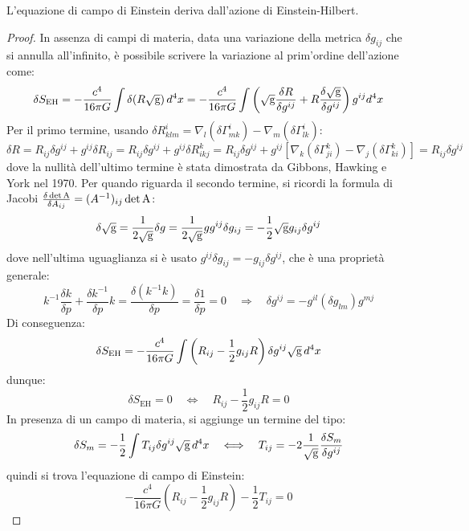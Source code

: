 \begin{proposition}
	L'equazione di campo di Einstein deriva dall'azione di Einstein-Hilbert.
\end{proposition}
\begin{proof}
	In assenza di campi di materia, data una variazione della metrica $ \delta g_{ij} $ che si annulla all'infinito, è possibile scrivere la variazione al prim'ordine dell'azione come:
	\begin{equation*}
		\delta S_{\text{EH}} = - \frac{c^4}{16\pi G} \int \delta (R\sqrt{\mathbf{\text{g}}}) \,d^4x = - \frac{c^4}{16\pi G} \int \left( \sqrt{\mathbf{\text{g}}} \frac{\delta R}{\delta g^{ij}} + R \frac{\delta \sqrt{\mathbf{\text{g}}}}{\delta g^{ij}} \right) g^{ij} d^4x
	\end{equation*}
	Per il primo termine, usando $ \delta R^i_{klm} = \nabla_l (\delta \Gamma^i_{mk}) - \nabla_m (\delta \Gamma^i_{lk}) $:
	\begin{equation*}
		\delta R = R_{ij} \delta g^{ij} + g^{ij} \delta R_{ij} = R_{ij} \delta g^{ij} + g^{ij} \delta R^k_{ikj} = R_{ij} \delta g^{ij} + g^{ij} \left[ \nabla_k (\delta \Gamma^k_{ji}) - \nabla_j (\delta \Gamma^k_{ki}) \right] = R_{ij} \delta g^{ij}
	\end{equation*}
	dove la nullità dell'ultimo termine è stata dimostrata da Gibbons, Hawking e York nel 1970. Per quando riguarda il secondo termine, si ricordi la formula di Jacobi $ \frac{\delta \det \mathbf{\text{A}}}{\delta A_{ij}} = (A^{-1})_{ij} \det \mathbf{\text{A}} $:
	\begin{equation*}
		\delta \sqrt{\mathbf{\text{g}}} = \frac{1}{2\sqrt{\mathbf{\text{g}}}} \delta g = \frac{1}{2\sqrt{\mathbf{\text{g}}}} g g^{ij} \delta g_{ij} = - \frac{1}{2} \sqrt{\mathbf{\text{g}}} g_{ij} \delta g^{ij}
	\end{equation*}
	dove nell'ultima uguaglianza si è usato $ g^{ij} \delta g_{ij} = - g_{ij} \delta g^{ij} $, che è una proprietà generale:
	\begin{equation*}
		k^{-1} \frac{\delta k}{\delta p} + \frac{\delta k^{-1}}{\delta p} k = \frac{\delta (k^{-1} k)}{\delta p} = \frac{\delta 1}{\delta p} = 0 \quad\Longrightarrow\quad \delta g^{ij} = - g^{il} (\delta g_{lm}) g^{mj}
	\end{equation*}
	Di conseguenza:
	\begin{equation*}
		\delta S_{\text{EH}} = - \frac{c^4}{16\pi G} \int \left( R_{ij} - \frac{1}{2} g_{ij} R \right) \delta g^{ij} \sqrt{\mathbf{\text{g}}} \,d^4x
	\end{equation*}
	dunque:
	\begin{equation*}
		\delta S_{\text{EH}} = 0 \quad\Longleftrightarrow\quad R_{ij} - \frac{1}{2} g_{ij} R = 0
	\end{equation*}
	In presenza di un campo di materia, si aggiunge un termine del tipo:
	\begin{equation*}
		\delta S_m = - \frac{1}{2} \int T_{ij} \delta g^{ij} \sqrt{\mathbf{\text{g}}} \,d^4x \quad\Longleftrightarrow\quad T_{ij} = - 2 \frac{1}{\sqrt{\mathbf{\text{g}}}} \frac{\delta S_m}{\delta g^{ij}}
	\end{equation*}
	quindi si trova l'equazione di campo di Einstein:
	\begin{equation*}
		- \frac{c^4}{16\pi G} \left( R_{ij} - \frac{1}{2} g_{ij} R \right) - \frac{1}{2} T_{ij} = 0
	\end{equation*}
\end{proof}










